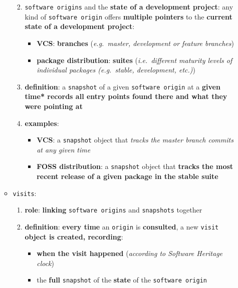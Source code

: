 \documentclass[11pt]{article}
\providecommand{\tightlist}{%
      \setlength{\itemsep}{0pt}\setlength{\parskip}{0pt}}
\begin{document}
\begin{enumerate}
\begin{itemize}
    \begin{enumerate}
    \def\labelenumii{\arabic{enumii}.}
    \tightlist
    \item
      \texttt{software\ origins} and the \textbf{state of a development
      project}: any kind of \texttt{software\ origin} offers
      \textbf{multiple pointers} to the \textbf{current state of a
      development project}:

      \begin{itemize}
      \tightlist
      \item
        \textbf{VCS}: \textbf{branches} (\emph{e.g.~master, development
        or feature branches})
      \item
        \textbf{package distribution}: \textbf{suites}
        (\emph{i.e.~different maturity levels of individual packages
        (e.g.~stable, development, etc.)})
      \end{itemize}
    \item
      \textbf{definition}: a \texttt{snapshot} of a given
      \texttt{software\ origin} at a \textbf{given time* records all
      entry points found there and what they were pointing at}
    \item
      \textbf{examples}:

      \begin{itemize}
      \tightlist
      \item
        \textbf{VCS}: a \texttt{snapshot} object that \emph{tracks the
        master branch commits at any given time}
      \item
        \textbf{FOSS distribution}: a \texttt{snapshot} object that
        \textbf{tracks the most recent release of a given package in the
        stable suite}
      \end{itemize}
    \end{enumerate}
  \item
    \texttt{visits}:

    \begin{enumerate}
    \def\labelenumii{\arabic{enumii}.}
    \tightlist
    \item
      \textbf{role}: \textbf{linking} \texttt{software\ origins} and
      \texttt{snapshots} together
    \item
      \textbf{definition}: \textbf{every time} an \texttt{origin} is
      \textbf{consulted}, a new \texttt{visit} \textbf{object is
      created, recording}:

      \begin{itemize}
      \tightlist
      \item
        \textbf{when the visit happened} (\emph{according to Software
        Heritage clock})
      \item
        the \textbf{full} \texttt{snapshot} of the \textbf{state} of the
        \texttt{software\ origin}
      \end{itemize}
    \end{enumerate}
  \end{itemize}
\end{enumerate}
\end{document}
